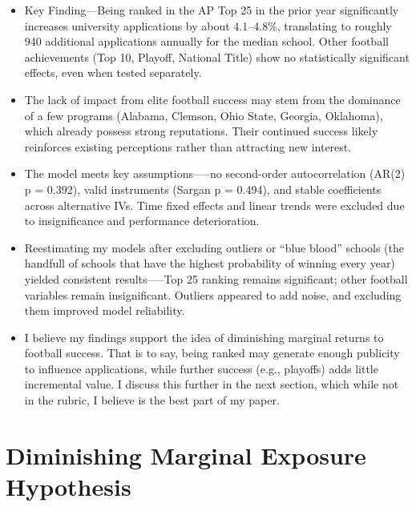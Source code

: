 \documentclass{article}
\begin{document}
\begin{itemize}
    
    \item Key Finding---Being ranked in the AP Top 25 in the prior year significantly increases university applications by about 4.1–4.8\%, translating to roughly 940 additional applications annually for the median school. Other football achievements (Top 10, Playoff, National Title) show no statistically significant effects, even when tested separately.

    \item The lack of impact from elite football success may stem from the dominance of a few programs (Alabama, Clemson, Ohio State, Georgia, Oklahoma), which already possess strong reputations. Their continued success likely reinforces existing perceptions rather than attracting new interest.

    \item The model meets key assumptions—--no second-order autocorrelation (AR(2) p = 0.392), valid instruments (Sargan p = 0.494), and stable coefficients across alternative IVs. Time fixed effects and linear trends were excluded due to insignificance and performance deterioration.

    
    \item Reestimating my models after excluding outliers or “blue blood” schools (the handfull of schools that have the highest probability of winning every year) yielded consistent results--—Top 25 ranking remains significant; other football variables remain insignificant. Outliers appeared to add noise, and excluding them improved model reliability.

    \item I believe my findings support the idea of diminishing marginal returns to football success. That is to say, being ranked may generate enough publicity to influence applications, while further success (e.g., playoffs) adds little incremental value. I discuss this further in the next section, which while not in the rubric, I believe is the best part of my paper.
    
\end{itemize}

\section{Diminishing Marginal Exposure Hypothesis}
\end{document}
